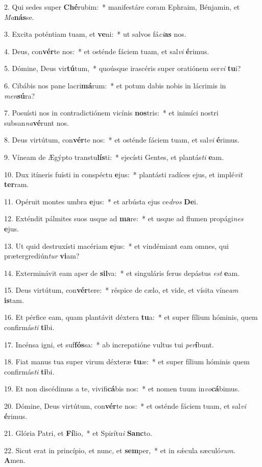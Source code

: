 2. Qui sedes super \textbf{Ché}rubim:~*  manifestáre coram Ephraim, Bénjamin, et \textit{Ma}\textbf{nás}se.\

3. Excita poténtiam tuam, et \textbf{ve}ni:~*  ut salvos fá\textit{ci}\textbf{as} nos.\

4. Deus, con\textbf{vér}te nos:~*  et osténde fáciem tuam, et sal\textit{vi} \textbf{é}rimus.\

5. Dómine, Deus vir\textbf{tú}tum,~*  quoúsque irascéris super oratiónem ser\textit{vi} \textbf{tu}i?\

6. Cibábis nos pane lacri\textbf{má}rum:~*  et potum dabis nobis in lácrimis in \textit{men}\textbf{sú}ra?\

7. Posuísti nos in contradictiónem vicínis \textbf{nos}tris:~*  et inimíci nostri subsan\textit{na}\textbf{vé}runt nos.\

8. Deus virtútum, con\textbf{vér}te nos:~*  et osténde fáciem tuam, et sal\textit{vi} \textbf{é}rimus.\

9. Víneam de Ægýpto transtu\textbf{lís}ti:~*  ejecísti Gentes, et plantás\textit{ti} \textbf{e}am.\

10. Dux itíneris fuísti in conspéctu \textbf{e}jus:~*  plantásti radíces ejus, et implé\textit{vit} \textbf{ter}ram.\

11. Opéruit montes umbra \textbf{e}jus:~*  et arbústa ejus ce\textit{dros} \textbf{De}i.\

12. Exténdit pálmites suos usque ad \textbf{ma}re:~*  et usque ad flumen propági\textit{nes} \textbf{e}jus.\

13. Ut quid destruxísti macériam \textbf{e}jus:~*  et vindémiant eam omnes, qui prætergrediún\textit{tur} \textbf{vi}am?\

14. Exterminávit eam aper de \textbf{sil}va:~*  et singuláris ferus depástus \textit{est} \textbf{e}am.\

15. Deus virtútum, con\textbf{vér}tere:~*  réspice de cælo, et vide, et vísita víne\textit{am} \textbf{is}tam.\

16. Et pérfice eam, quam plantávit déxtera \textbf{tu}a:~*  et super fílium hóminis, quem confirmás\textit{ti} \textbf{ti}bi.\

17. Incénsa igni, et suf\textbf{fós}sa:~*  ab increpatióne vultus tui \textit{per}\textbf{í}bunt.\

18. Fiat manus tua super virum déxteræ \textbf{tu}æ:~*  et super fílium hóminis quem confirmás\textit{ti} \textbf{ti}bi.\

19. Et non discédimus a te, vivifi\textbf{cá}bis nos:~*  et nomen tuum in\textit{vo}\textbf{cá}bimus.\

20. Dómine, Deus virtútum, con\textbf{vér}te nos:~*  et osténde fáciem tuam, et sal\textit{vi} \textbf{é}rimus.\

21. Glória Patri, et \textbf{Fí}lio,~*  et Spirítu\textit{i} \textbf{Sanc}to.\

22. Sicut erat in princípio, et nunc, et \textbf{sem}per,~*  et in sǽcula sæculó\textit{rum}. \textbf{A}men.\

